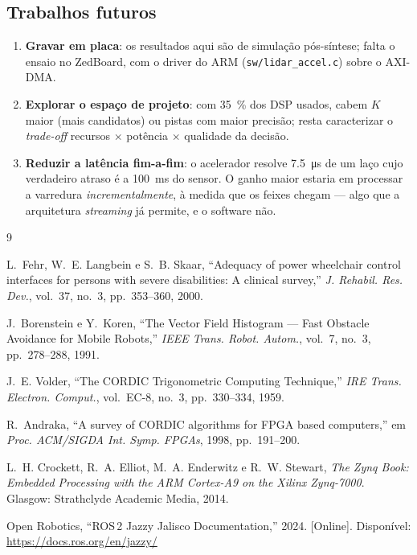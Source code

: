\documentclass[conference]{IEEEtran}
\begin{document}
\subsection{Trabalhos futuros}
\begin{enumerate}
\item \textbf{Gravar em placa}: os resultados aqui s\~ao de simula\c{c}\~ao
p\'os-s\'intese; falta o ensaio no ZedBoard, com o driver do ARM
(\texttt{sw/lidar\_accel.c}) sobre o AXI-DMA.
\item \textbf{Explorar o espa\c{c}o de projeto}: com \SI{35}{\percent} dos DSP
usados, cabem $K$ maior (mais candidatos) ou pistas com maior precis\~ao;
resta caracterizar o \emph{trade-off} recursos $\times$ pot\^encia $\times$
qualidade da decis\~ao.
\item \textbf{Reduzir a lat\^encia fim-a-fim}: o acelerador resolve
\SI{7.5}{\micro\second} de um la\c{c}o cujo verdadeiro atraso \'e a
\SI{100}{\milli\second} do sensor. O ganho maior estaria em processar a varredura
\emph{incrementalmente}, \`a medida que os feixes chegam --- algo que a
arquitetura \emph{streaming} j\'a permite, e o software n\~ao.
\end{enumerate}

\begin{thebibliography}{9}

L.~Fehr, W.~E. Langbein e S.~B. Skaar, ``Adequacy of power wheelchair control
interfaces for persons with severe disabilities: A clinical survey,''
\emph{J. Rehabil. Res. Dev.}, vol.~37, no.~3, pp.~353--360, 2000.

J.~Borenstein e Y.~Koren, ``The Vector Field Histogram --- Fast Obstacle
Avoidance for Mobile Robots,'' \emph{IEEE Trans. Robot. Autom.}, vol.~7, no.~3,
pp.~278--288, 1991.

J.~E. Volder, ``The CORDIC Trigonometric Computing Technique,'' \emph{IRE Trans.
Electron. Comput.}, vol.~EC-8, no.~3, pp.~330--334, 1959.

R.~Andraka, ``A survey of CORDIC algorithms for FPGA based computers,'' em
\emph{Proc. ACM/SIGDA Int. Symp. FPGAs}, 1998, pp.~191--200.

L.~H. Crockett, R.~A. Elliot, M.~A. Enderwitz e R.~W. Stewart, \emph{The Zynq
Book: Embedded Processing with the ARM Cortex-A9 on the Xilinx Zynq-7000}.
Glasgow: Strathclyde Academic Media, 2014.

Open Robotics, ``ROS\,2 Jazzy Jalisco Documentation,'' 2024. [Online].
Dispon\'ivel: \url{https://docs.ros.org/en/jazzy/}

\end{thebibliography}
\end{document}

